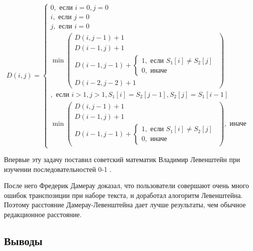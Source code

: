 \documentclass[a4paper,12pt]{article}
\begin{document}
\begin{equation}
D(i,j) =
\begin{cases}
    0, \text{ если } i = 0, j = 0 \\
    i, \text{ если } j = 0 \\
    j, \text{ если } i = 0 \\

    \min
    \left(
        \begin{matrix}
            D(i, j - 1) + 1 \\
            D(i - 1, j) + 1 \\
            D(i - 1, j - 1) +
            \begin{cases}
                1, \text{ если } S_1[i] \ne S_2[j] \\
                0, \text{ иначе}
            \end{cases} \\
            D(i - 2, j - 2) + 1
        \end{matrix}
    \right) \\
    , \text{ если } i > 1, j > 1, S_1[i] = S_2[j - 1], S_2[j] = S_1[i - 1] \\

    \min
    \left(
    \begin{matrix}
        D(i, j - 1) + 1 \\
        D(i - 1, j) + 1 \\
        D(i - 1, j - 1) +
        \begin{cases}
            1, \text{ если } S_1[i] \ne S_2[j] \\
            0, \text{ иначе}
        \end{cases}
    \end{matrix}
    \right)
    , \text{ иначе}
\end{cases}
\end{equation}

Впервые эту задачу поставил советский математик Владимир Левенштейн при
изучении последовательностей 0-1 \cite{binlev}.

После него Фредерик Дамерау доказал, что пользователи совершают очень много
ошибок транспозиции при наборе текста, и доработал алогоритм Левенштейна.
Поэтому расстояние Дамерау-Левенштейна дает лучше результаты, чем
обычное редакционное расстояние.

\subsection{Выводы}
\end{document}

